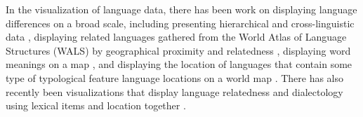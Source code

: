 







In the visualization of language data, there has been work on displaying language differences on a broad scale, including presenting hierarchical and cross-linguistic data \cite{Rohrdantz:2012, RMB+10}, displaying related languages gathered from the World Atlas of Language Structures (WALS) by geographical proximity and relatedness \cite{LittEACL}, displaying word meanings on a map \cite{theron}, and displaying the location of languages that contain some type of typological feature language locations on a world map \cite{Haspelmath_etal2008}. There has also recently been visualizations that display language relatedness and dialectology using lexical items and location together \cite{10.1371/journal.pone.0023613}. 

